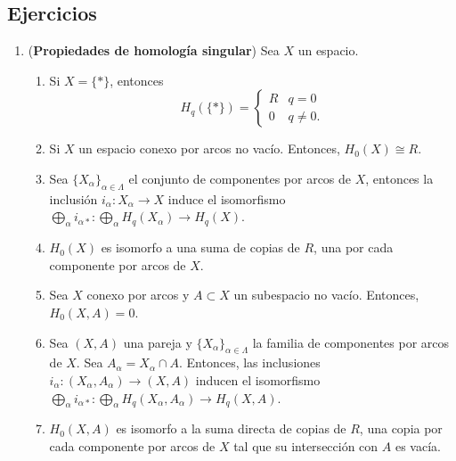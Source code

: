 \documentclass[11pt,a4paper]{article}
\theoremstyle{plain}
\theoremstyle{definition}
\theoremstyle{remark}
\begin{document}
\subsection*{Ejercicios}

\begin{enumerate}[label=\arabic*.,leftmargin=*]

\item (\textbf{Propiedades de homología singular}) Sea $X$ un espacio.
\begin{enumerate}[label=\alph*)]
\item Si $X=\{*\}$, entonces
\[
H_q(\{*\})=\begin{cases}R & q=0\\0 & q\ne0.\end{cases}
\]
\item Si $X$ un espacio conexo por arcos no vacío. Entonces,
$H_0(X)\cong R$.
\item Sea $\{X_\alpha\}_{\alpha\in\Lambda}$ el conjunto de componentes por
arcos de $X$, entonces la inclusión $i_\alpha:X_\alpha\to X$ induce el
isomorfismo $\bigoplus_\alpha i_{\alpha*}:\bigoplus_\alpha H_q(X_\alpha)\to H_q(X)$.
\item $H_0(X)$ es isomorfo a una suma de copias de $R$, una por cada
componente por arcos de $X$.
\item Sea $X$ conexo por arcos y $A\subset X$ un subespacio no vacío.
Entonces, $H_0(X,A)=0$.
\item Sea $(X,A)$ una pareja y $\{X_\alpha\}_{\alpha\in\Lambda}$ la familia
de componentes por arcos de $X$. Sea $A_\alpha=X_\alpha\cap A$. Entonces,
las inclusiones $i_\alpha:(X_\alpha,A_\alpha)\to(X,A)$ inducen el
isomorfismo $\bigoplus_\alpha i_{\alpha*}:\bigoplus_\alpha H_q(X_\alpha,A_\alpha)\to H_q(X,A)$.
\item $H_0(X,A)$ es isomorfo a la suma directa de copias de $R$, una copia
por cada componente por arcos de $X$ tal que su intersección con $A$ es
vacía.
\end{enumerate}


\end{enumerate}
\end{document}
